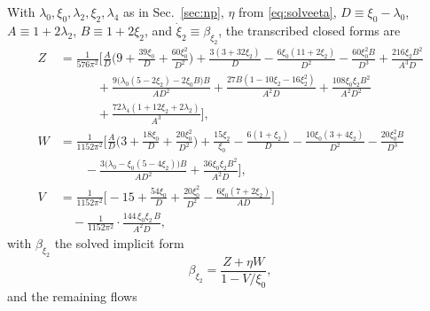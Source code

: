 \documentclass[11pt]{article}
\newcommand{\lfour}{\lambda_4}
\begin{document}
With $\lambda_0,\xi_0,\lambda_2,\xi_2,\lfour$ as in Sec.~\ref{sec:np},
$\eta$ from \eqref{eq:solveeta}, $D\equiv\xi_0-\lambda_0$,
$A\equiv 1+2\lambda_2$, $B\equiv 1+2\xi_2$, and
$\dot\xi_2\equiv\beta_{\xi_2}$, the transcribed closed forms are
\begin{align}
  Z&=\frac{1}{576\pi^2}\Bigg[
    \frac{A}{D}\Big(9+\frac{39\xi_0}{D}+\frac{60\xi_0^2}{D^2}\Big)
    +\frac{3(3+32\xi_2)}{D}
    -\frac{6\xi_0(11+2\xi_2)}{D^2}
    -\frac{60\xi_0^2 B}{D^3}
    +\frac{216\xi_2 B^2}{A^3 D}\nonumber\\
  &\qquad\quad+\frac{9\big(\lambda_0(5-2\xi_2)-2\xi_0B\big)B}{A D^2}
    +\frac{27B(1-10\xi_2-16\xi_2^2)}{A^2 D}
    +\frac{108\xi_0\xi_2B^2}{A^2 D^2}\nonumber\\
  &\qquad\quad+\frac{72\lfour(1+12\xi_2+2\lambda_2)}{A^3}\Bigg],\\
  W&=\frac{1}{1152\pi^2}\Bigg[
    \frac{A}{D}\Big(3+\frac{18\xi_0}{D}+\frac{20\xi_0^2}{D^2}\Big)
    +\frac{15\xi_2}{\xi_0}-\frac{6(1+\xi_2)}{D}
    -\frac{10\xi_0(3+4\xi_2)}{D^2}
    -\frac{20\xi_0^2B}{D^3}\nonumber\\
    &\qquad-\frac{3\big(\lambda_0-\xi_0(5-4\xi_2)\big)B}{A D^2}
    +\frac{36\xi_0\xi_2B^2}{A^2 D}\Bigg],\\
  V&=\frac{1}{1152\pi^2}\Bigg[
    -15+\frac{54\xi_0}{D}+\frac{20\xi_0^2}{D^2}
    -\frac{6\xi_0(7+2\xi_2)}{A D}\Bigg]
    \nonumber\\
  &\quad-\frac{1}{1152\pi^2}\cdot\frac{144\,\xi_0\xi_2\,B}{A^2 D},
\end{align}
with $\beta_{\xi_2}$ the solved implicit form
\begin{equation}
  \label{eq:xi2solved}
  \beta_{\xi_2}=\frac{Z+\eta W}{1-V/\xi_0},
\end{equation}
and the remaining flows
\end{document}
